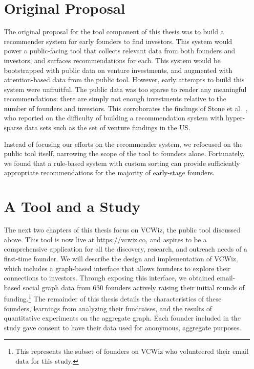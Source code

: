 \section{Original Proposal}

The original proposal for the tool component of this thesis was to build a recommender system for early founders to find investors. This system would power a public-facing tool that collects relevant data from both founders and investors, and surfaces recommendations for each. This system would be bootstrapped with public data on venture investments, and augmented with attention-based data from the public tool. However, early attempts to build this system were unfruitful. The public data was too sparse to render any meaningful recommendations: there are simply not enough investments relative to the number of founders and investors. This corroborates the findings of Stone et al.~\cite{Stone:2013:EST:2541167.2507882}, who reported on the difficulty of building a recommendation system with hyper-sparse data sets such as the set of venture fundings in the US.

Instead of focusing our efforts on the recommender system, we refocused on the public tool itself, narrowing the scope of the tool to founders alone. Fortunately, we found that a rule-based system with custom sorting can provide sufficiently appropriate recommendations for the majority of early-stage founders.

\section{A Tool and a Study}

The next two chapters of this thesis focus on VCWiz, the public tool discussed above. This tool is now live at \url{https://vcwiz.co}, and aspires to be a comprehensive application for all the discovery, research, and outreach needs of a first-time founder. We will describe the design and implementation of VCWiz, which includes a graph-based interface that allows founders to explore their connections to investors. Through exposing this interface, we obtained email-based social graph data from $630$ founders actively raising their initial rounds of funding.\footnote{This represents the subset of founders on VCWiz who volunteered their email data for this study.} The remainder of this thesis details the characteristics of these founders, learnings from analyzing their fundraises, and the results of quantitative experiments on the aggregate graph. Each founder included in the study gave consent to have their data used for anonymous, aggregate purposes.

